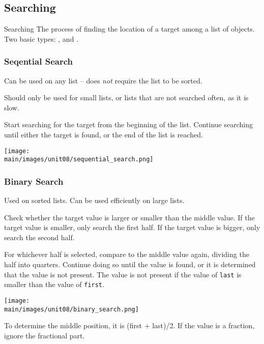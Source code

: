 \documentclass[\main/notes.tex]{subfiles}
\begin{document}
			\subsection{Searching}
				\begin{definition}{Searching}
					The process of finding the location of a target among a list of objects. Two basic types: , and .
				\end{definition}
				\subsubsection{Seqential Search}
					Can be used on any list -- does \emph{not} require the list to be sorted.

					Should only be used for small lists, or lists that are not searched often, as it is slow.

					Start searching for the target from the beginning of the list. Continue searching until either the target is found, or the end of the list is reached.

					\begin{center}
						\texttt{[image: \\main/images/unit08/sequential\_search.png]}
					\end{center}
				\subsubsection{Binary Search}
					Used on sorted lists. Can be used efficiently on large lists.

					Check whether the target value is larger or smaller than the middle value. If the target value is smaller, only search the first half. If the target value is bigger, only search the second half.

					For whichever half is selected, compare to the middle value again, dividing the half into quarters. Continue doing so until the value is found, or it is determined that the value is not present. The value is not present if the value of \texttt{last} is smaller than the value of \texttt{first}.

					\begin{center}
						\texttt{[image: \\main/images/unit08/binary\_search.png]}
					\end{center}

					To determine the middle position, it is (first + last)/2. If the value is a fraction, ignore the fractional part.
		\pagebreak
\end{document}
